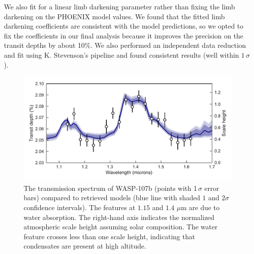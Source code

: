 \documentclass[twocolumn, trackchanges]{aastex61}
\begin{document}
We also fit for a linear limb darkening parameter rather than fixing the limb darkening on the PHOENIX model values. We found that the fitted limb darkening coefficients are consistent with the model predictions, so we opted to fix the coefficients in our final analysis because it improves the precision on the transit depths by about 10\%.  We also performed an independent data reduction and fit using K. Stevenson's pipeline and found consistent results (well within $1\,\sigma$). 



\begin{figure}
\includegraphics[width = \textwidth]{fig2_spectrum.pdf}
\caption{The transmission spectrum of WASP-107b (points with 1\,$\sigma$ error bars) compared to retrieved models (blue line with shaded $1$ and $2\sigma$ confidence intervals). The features at $1.15$ and $1.4$ $\mu$m are due to water absorption. The right-hand axis indicates the normalized atmospheric scale height assuming solar composition. The water feature crosses less than one scale height, indicating that condensates are present at high altitude.} 
\label{fig:spectrum}
\end{figure}
\end{document}
